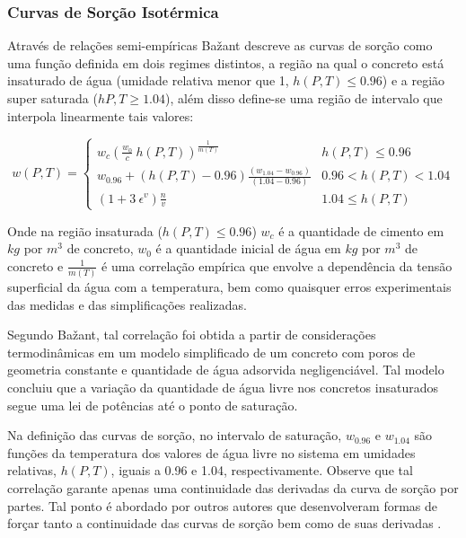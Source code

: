 \subsubsection{Curvas de Sorção Isotérmica}
Através de relações semi-empíricas Ba\v{z}ant descreve as curvas de sorção como
uma função definida em dois regimes distintos, a região na qual o concreto está
insaturado de água (umidade relativa menor que 1, $h(P, T) \leq 0.96$) e a
região super saturada ($h{P,T} \geq 1.04$), além disso define-se uma região de
intervalo que interpola linearmente tais valores:

\begin{equation}
  \label{eq:baz_phi}
  w(P, T) =
  \begin{cases} 
    w_c \left( \frac{w_0}{c} \ h(P,T) \right)^{\frac{1}{m(T)}} & h(P, T)\leq 0.96 \\
    w_{0.96} + (h(P, T) - 0.96) \frac{(w_{1.04} - w_{0.96})}{(1.04-0.96)} & 0.96 < h(P, T) < 1.04 \\
    (1 + 3 \ \epsilon^v)\frac{n}{v} & 1.04\leq h(P, T)
  \end{cases}
\end{equation}
    
Onde na região insaturada ($h(P, T) \leq 0.96$) $w_c$ é a quantidade de cimento
em $kg$ por $m^3$ de concreto, $w_0$ é a quantidade inicial de água em $kg$ por
$m^3$ de concreto e $\frac{1}{m(T)}$ é uma correlação empírica que envolve a
dependência da tensão superficial da água com a temperatura, bem como quaisquer
erros experimentais das medidas e das simplificações realizadas.

Segundo Ba\v{z}ant, tal correlação foi obtida a partir de considerações
termodinâmicas em um modelo simplificado de um concreto com poros de geometria
constante e quantidade de água adsorvida negligenciável. Tal modelo concluiu que
a variação da quantidade de água livre nos concretos insaturados segue uma lei
de potências até o ponto de saturação.

Na definição das curvas de sorção, no intervalo de saturação, $w_{0.96}$ e
$w_{1.04}$ são funções da temperatura dos valores de água livre no sistema em
umidades relativas, $h(P, T)$, iguais a 0.96 e 1.04, respectivamente. Observe
que tal correlação garante apenas uma continuidade das derivadas da curva de
sorção por partes. Tal ponto é abordado por outros autores que desenvolveram
formas de forçar tanto a continuidade das curvas de sorção bem como de suas
derivadas \cite{Fey2016b}.

